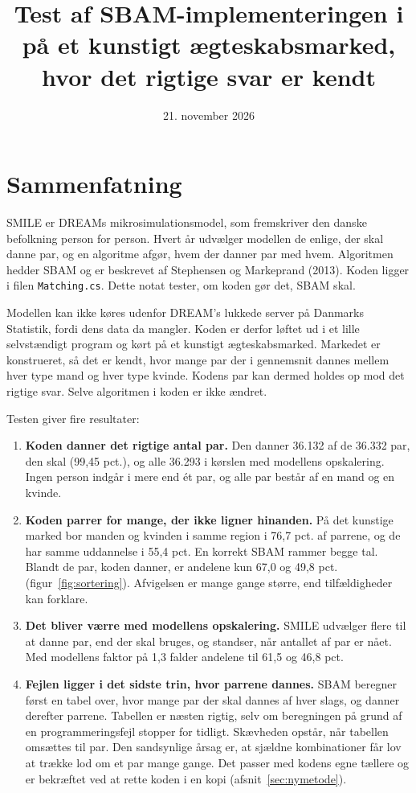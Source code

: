 \documentclass[11pt,a4paper]{article}
\title{Test af SBAM-implementeringen i \kode{Matching.cs}\\[4pt]
\large på et kunstigt ægteskabsmarked, hvor det rigtige svar er kendt}
\author{}
\date{21. november 2026}
\newcommand{\kode}[1]{\texttt{#1}}
\begin{document}
\maketitle
\vspace{-3em}

\section{Sammenfatning}

SMILE er DREAMs mikrosimulationsmodel, som fremskriver den danske befolkning person for person. Hvert
år udvælger modellen de enlige, der skal danne par, og en algoritme afgør, hvem der danner par med
hvem. Algoritmen hedder SBAM og er beskrevet af Stephensen og Markeprand (2013). Koden ligger i
filen \kode{Matching.cs}. Dette notat tester, om koden gør det, SBAM skal.

Modellen kan ikke køres udenfor DREAM's lukkede server på Danmarks Statistik, fordi dens data da mangler. 
Koden er derfor løftet ud i et lille selvstændigt
program og kørt på et kunstigt ægteskabsmarked. Markedet er konstrueret, så det er kendt, hvor mange
par der i gennemsnit dannes mellem hver type mand og hver type kvinde. Kodens par kan dermed holdes
op mod det rigtige svar. Selve algoritmen i koden er ikke ændret.

Testen giver fire resultater:

\begin{enumerate}
\item \textbf{Koden danner det rigtige antal par.} Den danner 36.132 af de 36.332 par, den skal
(99,45 pct.), og alle 36.293 i kørslen med modellens opskalering. Ingen person indgår i mere end ét
par, og alle par består af en mand og en kvinde.

\item \textbf{Koden parrer for mange, der ikke ligner hinanden.} På det kunstige marked bor manden og
kvinden i samme region i 76,7 pct. af parrene, og de har samme uddannelse i 55,4 pct. En korrekt SBAM
rammer begge tal. Blandt de par, koden danner, er andelene kun 67,0 og 49,8 pct.
(figur~\ref{fig:sortering}). Afvigelsen er mange gange større, end tilfældigheder kan forklare.

\item \textbf{Det bliver værre med modellens opskalering.} SMILE udvælger flere til at danne par, end
der skal bruges, og standser, når antallet af par er nået. Med modellens faktor på 1,3 falder
andelene til 61,5 og 46,8 pct.

\item \textbf{Fejlen ligger i det sidste trin, hvor parrene dannes.} SBAM beregner først en tabel
over, hvor mange par der skal dannes af hver slags, og danner derefter parrene. Tabellen er næsten
rigtig, selv om beregningen på grund af en programmeringsfejl stopper for tidligt. Skævheden opstår,
når tabellen omsættes til par. Den sandsynlige årsag er, at sjældne kombinationer får lov at trække
lod om et par mange gange. Det passer med kodens egne tællere og er bekræftet ved at rette koden i en
kopi (afsnit~\ref{sec:nymetode}).
\end{enumerate}
\end{document}
